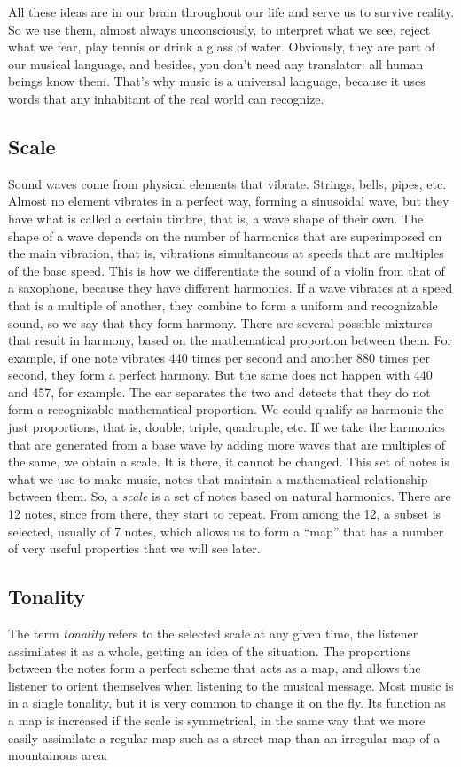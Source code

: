 \documentclass[]{report}
\begin{document}
All these ideas are in our brain throughout our life and serve us to survive reality. So we use them, almost always unconsciously, to interpret what we see, reject what we fear, play tennis or drink a glass of water. Obviously, they are part of our musical language, and besides, you don't need any translator: all human beings know them. That's why music is a universal language, because it uses words that any inhabitant of the real world can recognize.
\subsection{Scale}
Sound waves come from physical elements that vibrate. Strings, bells, pipes, etc. Almost no element vibrates in a perfect way, forming a sinusoidal wave, but they have what is called a certain timbre, that is, a wave shape of their own. The shape of a wave depends on the number of harmonics that are superimposed on the main vibration, that is, vibrations simultaneous at speeds that are multiples of the base speed. This is how we differentiate the sound of a violin from that of a saxophone, because they have different harmonics. If a wave vibrates at a speed that is a multiple of another, they combine to form a uniform and recognizable sound, so we say that they form harmony. There are several possible mixtures that result in harmony, based on the mathematical proportion between them. For example, if one note vibrates 440 times per second and another 880 times per second, they form a perfect harmony. But the same does not happen with 440 and 457, for example. The ear separates the two and detects that they do not form a recognizable mathematical proportion. We could qualify as harmonic the just proportions, that is, double, triple, quadruple, etc.
If we take the harmonics that are generated from a base wave by adding more waves that are multiples of the same, we obtain a scale. It is there, it cannot be changed.
This set of notes is what we use to make music, notes that maintain a mathematical relationship between them.
So, a \emph{scale} is a set of notes based on natural harmonics. There are 12 notes, since from there, they start to repeat. From among the 12, a subset is selected, usually of 7 notes, which allows us to form a ``map'' that has a number of very useful properties that we will see later.
\subsection{Tonality}
The term \emph{tonality} refers to the selected scale at any given time, the listener assimilates it as a whole, getting an idea of the situation. The proportions between the notes form a perfect scheme that acts as a map, and allows the listener to orient themselves when listening to the musical message. Most music is in a single tonality, but it is very common to change it on the fly. Its function as a map is increased if the scale is symmetrical, in the same way that we more easily assimilate a regular map such as a street map than an irregular map of a mountainous area.
\end{document}
